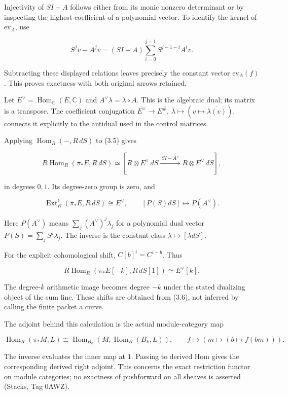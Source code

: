 \documentclass[
]{article}
\begin{document}
Injectivity of \(SI-A\) follows either from its monic nonzero
determinant or by inspecting the highest coefficient of a polynomial
vector. To identify the kernel of \(\mathrm{ev}_A\), use

\[S^jv-A^jv=(SI-A)\sum_{i=0}^{j-1}S^{j-1-i}A^iv.\]

Subtracting these displayed relations leaves precisely the constant
vector \(\mathrm{ev}_A(f)\). This proves exactness with both original
arrows retained.

Let \(E^\vee=\operatorname{Hom}_\mathbb C(E,\mathbb C)\) and
\(A^\vee\lambda=\lambda\circ A\). This is the algebraic dual; its matrix
is a transpose. The coefficient conjugation
\(\overline{E^\vee}\to E^\#\),
\(\overline\lambda\mapsto(v\mapsto\overline{\lambda(v)})\), connects it
explicitly to the antidual used in the control matrices.

Applying \(\operatorname{Hom}_R(-,R\,dS)\) to (3.5) gives

\[R\operatorname{Hom}_R(\pi_*E,R\,dS)
\simeq [R\otimes E^\vee\,dS\xrightarrow{\ S I-A^\vee\ }R\otimes E^\vee\,dS],\tag{3.6}\]

in degrees \(0,1\). Its degree-zero group is zero, and

\[\boxed{\operatorname{Ext}^1_R(\pi_*E,R\,dS)\cong E^\vee,\qquad
[P(S)dS]\mapsto P(A^\vee).}\tag{3.7}\]

Here \(P(A^\vee)\) means \(\sum_j(A^\vee)^j\lambda_j\) for a polynomial
dual vector \(P(S)=\sum_jS^j\lambda_j\). The inverse is the constant
class \(\lambda\mapsto[\lambda dS]\).

For the explicit cohomological shift, \(C[b]^i=C^{i+b}\). Thus

\[R\operatorname{Hom}_R(\pi_*E[-k],R\,dS[1])\simeq E^\vee[k].\tag{3.8}\]

The degree-\(k\) arithmetic image becomes degree \(-k\) under the stated
dualizing object of the sum line. These shifts are obtained from (3.6),
not inferred by calling the finite packet a curve.

The adjoint behind this calculation is the actual module-category map

\[\operatorname{Hom}_R(\pi_*M,L)\cong
\operatorname{Hom}_{B_k}(M,\operatorname{Hom}_R(B_k,L)),\qquad
f\mapsto(m\mapsto(b\mapsto f(bm))).\tag{3.9}\]

The inverse evaluates the inner map at \(1\). Passing to derived Hom
gives the corresponding derived right adjoint. This concerns the exact
restriction functor on module categories; no exactness of pushforward on
all sheaves is asserted (Stacks, Tag 0AWZ).
\end{document}
